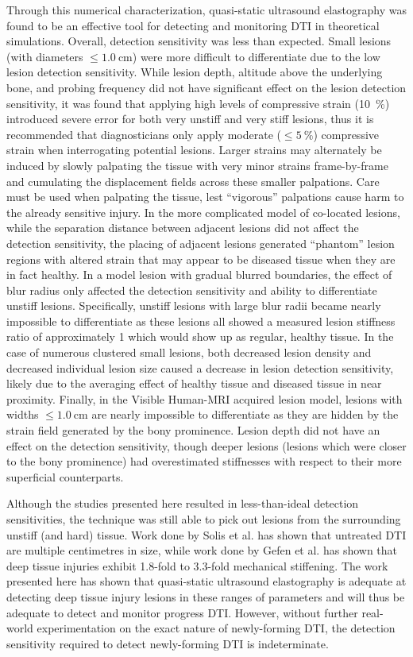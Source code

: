 		Through this numerical characterization, quasi-static ultrasound elastography was found to be an effective tool for detecting and monitoring DTI in theoretical simulations. Overall, detection sensitivity was less than expected. Small lesions (with diameters $\leq \SI{1.0}{\cm}$) were more difficult to differentiate due to the low lesion detection sensitivity. While lesion depth, altitude above the underlying bone, and probing frequency did not have significant effect on the lesion detection sensitivity, it was found that applying high levels of compressive strain (\SI{10}{\percent}) introduced severe error for both very unstiff and very stiff lesions, thus it is recommended that diagnosticians only apply moderate ($\leq \SI{5}{\percent}$) compressive strain when interrogating potential lesions. Larger strains may alternately be induced by slowly palpating the tissue with very minor strains frame-by-frame and cumulating the displacement fields across these smaller palpations. Care must be used when palpating the tissue, lest ``vigorous'' palpations cause harm to the already sensitive injury. In the more complicated model of co-located lesions, while the separation distance between adjacent lesions did not affect the detection sensitivity, the placing of adjacent lesions generated ``phantom'' lesion regions with altered strain that may appear to be diseased tissue when they are in fact healthy. In a model lesion with gradual blurred boundaries, the effect of blur radius only affected the detection sensitivity and ability to differentiate unstiff lesions. Specifically, unstiff lesions with large blur radii became nearly impossible to differentiate as these lesions all showed a measured lesion stiffness ratio of approximately 1 which would show up as regular, healthy tissue. In the case of numerous clustered small lesions, both decreased lesion density and decreased individual lesion size caused a decrease in lesion detection sensitivity, likely due to the averaging effect of healthy tissue and diseased tissue in near proximity. Finally, in the Visible Human-MRI acquired lesion model, lesions with widths $\leq \SI{1.0}{\cm}$ are nearly impossible to differentiate as they are hidden by the strain field generated by the bony prominence. Lesion depth did not have an effect on the detection sensitivity, though deeper lesions (lesions which were closer to the bony prominence) had overestimated stiffnesses with respect to their more superficial counterparts.

		Although the studies presented here resulted in less-than-ideal detection sensitivities, the technique was still able to pick out lesions from the surrounding unstiff (and hard) tissue. Work done by Solis et al. \cite{solis13} has shown that untreated DTI are multiple centimetres in size, while work done by Gefen et al. \cite{gefen05} has shown that deep tissue injuries exhibit 1.8-fold to 3.3-fold mechanical stiffening. The work presented here has shown that quasi-static ultrasound elastography is adequate at detecting deep tissue injury lesions in these ranges of parameters and will thus be adequate to detect and monitor progress DTI. However, without further real-world experimentation on the exact nature of newly-forming DTI, the detection sensitivity required to detect newly-forming DTI is indeterminate.


